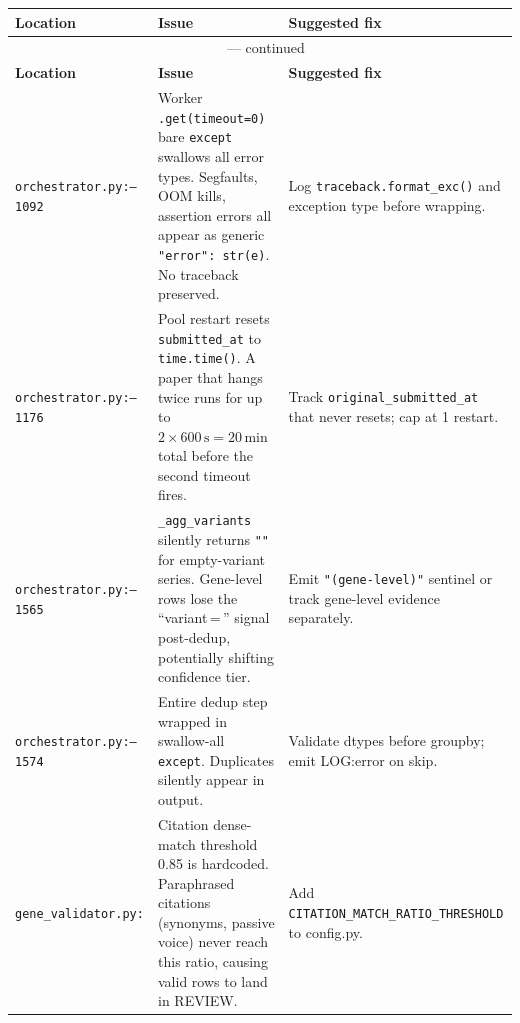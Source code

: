 \documentclass[11pt,a4paper]{article}
\begin{document}
\begin{longtable}{p{}p{}p{}}
\toprule
\textbf{Location} & \textbf{Issue} & \textbf{Suggested fix} \\
\midrule
\endfirsthead
\multicolumn{3}{c}{{\tablename\ \thetable{} --- continued}} \\
\toprule \textbf{Location} & \textbf{Issue} & \textbf{Suggested fix} \\
\midrule
\endhead
\bottomrule
\endlastfoot

\rowcolor{LightRed}
\texttt{orchestrator.py:\linebreak 1085--1092} &
  Worker \texttt{.get(timeout=0)} bare \texttt{except} swallows all error types.
  Segfaults, OOM kills, assertion errors all appear as generic \texttt{"error": str(e)}.
  No traceback preserved. &
  Log \texttt{traceback.format\_exc()} and exception type before wrapping. \\

\rowcolor{LightRed}
\texttt{orchestrator.py:\linebreak 1169--1176} &
  Pool restart resets \texttt{submitted\_at} to \texttt{time.time()}. A paper that hangs twice runs
  for up to $2 \times 600\,\text{s} = 20\,\text{min}$ total before the second timeout fires. &
  Track \texttt{original\_submitted\_at} that never resets; cap at 1 restart. \\

\rowcolor{LightRed}
\texttt{orchestrator.py:\linebreak 1563--1565} &
  \texttt{\_agg\_variants} silently returns \texttt{""} for empty-variant series. Gene-level rows lose
  the ``variant\,=\,{}'' signal post-dedup, potentially shifting confidence tier. &
  Emit \texttt{"(gene-level)"} sentinel or track gene-level evidence separately. \\

\rowcolor{LightRed}
\texttt{orchestrator.py:\linebreak 1573--1574} &
  Entire dedup step wrapped in swallow-all \texttt{except}. Duplicates silently appear in output. &
  Validate dtypes before groupby; emit LOG:error on skip. \\

\rowcolor{LightRed}
\texttt{gene\_validator.py:\linebreak 704} &
  Citation dense-match threshold 0.85 is hardcoded. Paraphrased citations
  (synonyms, passive voice) never reach this ratio, causing valid rows to land in REVIEW. &
  Add \texttt{CITATION\_MATCH\_RATIO\_THRESHOLD} to config.py. \\


\end{longtable}
\end{document}
